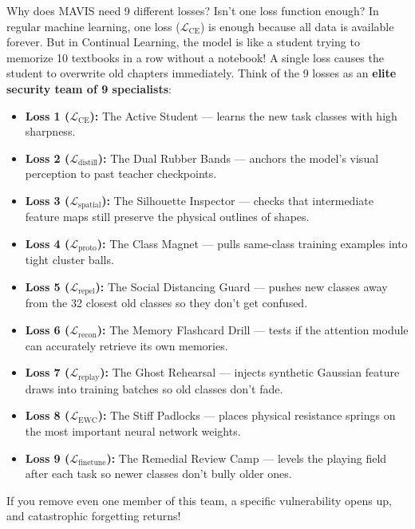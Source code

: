 \documentclass[11pt,a4paper]{article}
\begin{document}
\begin{callout}
Why does MAVIS need 9 different losses? Isn't one loss function enough?\newline
In regular machine learning, one loss ($\mathcal{L}_{\text{CE}}$) is enough because all data is available forever. But in Continual Learning, the model is like a student trying to memorize 10 textbooks in a row without a notebook! A single loss causes the student to overwrite old chapters immediately.\newline
Think of the 9 losses as an \textbf{elite security team of 9 specialists}:
\begin{itemize}[noitemsep]
    \item \textbf{Loss 1 ($\mathcal{L}_{\text{CE}}$):} The Active Student — learns the new task classes with high sharpness.
    \item \textbf{Loss 2 ($\mathcal{L}_{\text{distill}}$):} The Dual Rubber Bands — anchors the model's visual perception to past teacher checkpoints.
    \item \textbf{Loss 3 ($\mathcal{L}_{\text{spatial}}$):} The Silhouette Inspector — checks that intermediate feature maps still preserve the physical outlines of shapes.
    \item \textbf{Loss 4 ($\mathcal{L}_{\text{proto}}$):} The Class Magnet — pulls same-class training examples into tight cluster balls.
    \item \textbf{Loss 5 ($\mathcal{L}_{\text{repel}}$):} The Social Distancing Guard — pushes new classes away from the 32 closest old classes so they don't get confused.
    \item \textbf{Loss 6 ($\mathcal{L}_{\text{recon}}$):} The Memory Flashcard Drill — tests if the attention module can accurately retrieve its own memories.
    \item \textbf{Loss 7 ($\mathcal{L}_{\text{replay}}$):} The Ghost Rehearsal — injects synthetic Gaussian feature draws into training batches so old classes don't fade.
    \item \textbf{Loss 8 ($\mathcal{L}_{\text{EWC}}$):} The Stiff Padlocks — places physical resistance springs on the most important neural network weights.
    \item \textbf{Loss 9 ($\mathcal{L}_{\text{finetune}}$):} The Remedial Review Camp — levels the playing field after each task so newer classes don't bully older ones.
\end{itemize}
If you remove even one member of this team, a specific vulnerability opens up, and catastrophic forgetting returns!
\end{callout}
\end{document}
